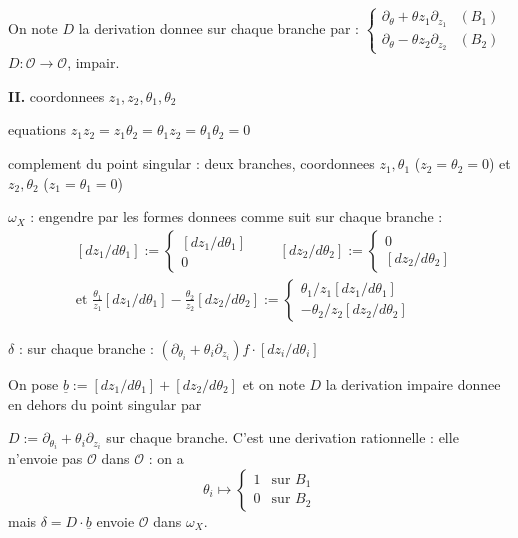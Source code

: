 \documentclass[11pt,a4paper]{article}
\theoremstyle{plain}
\theoremstyle{definition}
\begin{document}
On note $D$ la derivation donnee sur chaque branche par : $\begin{cases} \partial_\theta + \theta z_1\partial_{z_1} & (B_1) \\ \partial_\theta - \theta z_2\partial_{z_2} & (B_2) \end{cases}$ $D : \mathcal{O} \to \mathcal{O}$, impair.

\medskip

\noindent \textbf{II.} coordonnees $z_1, z_2, \theta_1, \theta_2$

equations $z_1 z_2 = z_1\theta_2 = \theta_1 z_2 = \theta_1\theta_2 = 0$

complement du point singular : deux branches, coordonnees $z_1, \theta_1$ ($z_2 = \theta_2 = 0$) et $z_2, \theta_2$ ($z_1 = \theta_1 = 0$)

$\omega_X$ : engendre par les formes donnees comme suit sur chaque branche :
\[
\begin{aligned}
&[dz_1/d\theta_1] := \begin{cases} [dz_1/d\theta_1] \\ 0 \end{cases} \qquad [dz_2/d\theta_2] := \begin{cases} 0 \\ [dz_2/d\theta_2] \end{cases} \\
&\text{et } \frac{\theta_1}{z_1}[dz_1/d\theta_1] - \frac{\theta_2}{z_2}[dz_2/d\theta_2] := \begin{cases} \theta_1/z_1 [dz_1/d\theta_1] \\ -\theta_2/z_2 [dz_2/d\theta_2] \end{cases}
\end{aligned}
\]

$\delta$ : sur chaque branche : $(\partial_{\theta_i} + \theta_i\partial_{z_i})f \cdot [dz_i/d\theta_i]$

On pose $\underline{b} := [dz_1/d\theta_1] + [dz_2/d\theta_2]$ et on note $D$ la derivation impaire donnee en dehors du point singular par

\newpage

$D := \partial_{\theta_i} + \theta_i\partial_{z_i}$ sur chaque branche. C'est une derivation rationnelle : elle n'envoie pas $\mathcal{O}$ dans $\mathcal{O}$ : on a
\[
\theta_i \longmapsto \begin{cases} 1 & \text{sur } B_1 \\ 0 & \text{sur } B_2 \end{cases}
\]
mais $\delta = D \cdot \underline{b}$ envoie $\mathcal{O}$ dans $\omega_X$.
\end{document}

